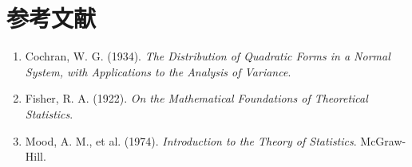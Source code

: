 \documentclass[12pt, a4paper]{article}
\begin{document}
\section{参考文献}
\begin{enumerate}
    \item Cochran, W. G. (1934). \textit{The Distribution of Quadratic Forms in a Normal System, with Applications to the Analysis of Variance}.
    \item Fisher, R. A. (1922). \textit{On the Mathematical Foundations of Theoretical Statistics}.
    \item Mood, A. M., et al. (1974). \textit{Introduction to the Theory of Statistics}. McGraw-Hill.
\end{enumerate}
\end{document}
